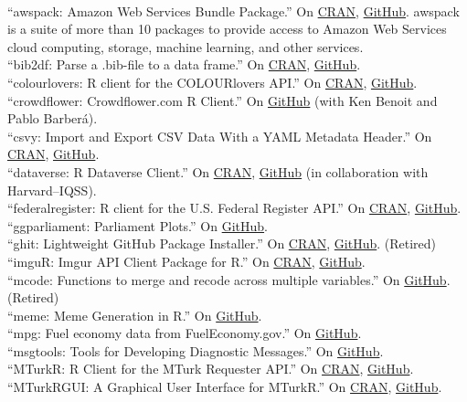 \documentclass[12pt]{article}
\newcommand{\topic}[1]{\pagebreak[3]\indent {\color{lg}{\footnotesize #1 }}\\}
\newcommand{\entry}[1]{\indent {\color{lg}\guillemotright}\hspace{2pt}#1\vspace{.25em}\\}
\begin{document}
\topic{R Packages: Retired Packages \& Major Contributions}
	\entry{``awspack: Amazon Web Services Bundle Package.'' On \href{https://cran.r-project.org/package=awspack}{CRAN}, \href{https://github.com/cloudyr/awspack}{GitHub}. awspack is a suite of more than 10 packages to provide access to Amazon Web Services cloud computing, storage, machine learning, and other services.}
   	\entry{``bib2df: Parse a .bib-file to a data frame.'' On \href{https://cran.r-project.org/package=bib2df}{CRAN}, \href{https://github.com/ottlngr/bib2df}{GitHub}.}
	\entry{``colourlovers: R client for the COLOURlovers API.'' On \href{https://cran.r-project.org/package=colourlovers}{CRAN}, \href{https://github.com/leeper/colourlovers}{GitHub}.}
	\entry{``crowdflower: Crowdflower.com R Client.'' On \href{https://github.com/cloudyr/crowdflower}{GitHub} (with Ken Benoit and Pablo Barber\'{a}).}
	\entry{``csvy: Import and Export CSV Data With a YAML Metadata Header.'' On \href{https://cran.r-project.org/package=csvy}{CRAN}, \href{https://github.com/leeper/csvy}{GitHub}.}
	\entry{``dataverse: R Dataverse Client.'' On \href{https://cran.r-project.org/package=dataverse}{CRAN}, \href{https://github.com/iqss/dataverse-client-r}{GitHub} (in collaboration with Harvard--IQSS).}
	\entry{``federalregister: R client for the U.S. Federal Register API.'' On \href{https://cran.r-project.org/package=federalregister}{CRAN}, \href{https://github.com/rOpenGov/federalregister}{GitHub}.}
	\entry{``ggparliament: Parliament Plots.'' On \href{https://github.com/leeper/ggparliament}{GitHub}.}
	\entry{``ghit: Lightweight GitHub Package Installer.'' On \href{https://cran.r-project.org/package=ghit}{CRAN}, \href{https://github.com/cloudyr/ghit}{GitHub}. (Retired)}
	\entry{``imguR: Imgur API Client Package for R.'' On \href{https://cran.r-project.org/package=imguR}{CRAN}, \href{https://github.com/cloudyr/imguR}{GitHub}.}
	\entry{``mcode: Functions to merge and recode across multiple variables.'' On \href{https://github.com/leeper/mcode}{GitHub}. (Retired)}
	\entry{``meme: Meme Generation in R.'' On \href{https://github.com/leeper/meme}{GitHub}.}
	\entry{``mpg: Fuel economy data from FuelEconomy.gov.'' On \href{https://github.com/rOpenGov/mpg}{GitHub}.}
	\entry{``msgtools: Tools for Developing Diagnostic Messages.'' On \href{https://github.com/RL10N/msgtools}{GitHub}.}
	\entry{``MTurkR: R Client for the MTurk Requester API.'' On \href{https://cran.r-project.org/package=MTurkR}{CRAN}, \href{https://github.com/leeper/MTurkR}{GitHub}.}
	\entry{``MTurkRGUI: A Graphical User Interface for MTurkR.'' On \href{https://cran.r-project.org/package=MTurkRGUI}{CRAN}, \href{https://github.com/leeper/MTurkRGUI}{GitHub}.}
\end{document}

